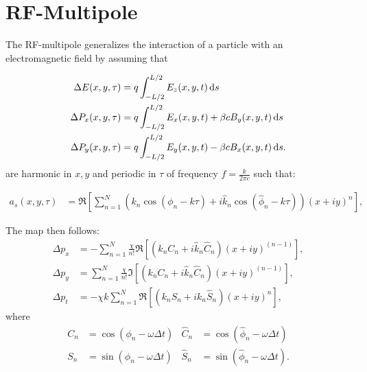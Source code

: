 \documentclass[english]{article}
\begin{document}
\section{RF-Multipole}

The RF-multipole generalizes the interaction of a particle with an electromagnetic field by assuming that

\begin{align}
\Delta E(x,y,\tau) &= q \int_{-L/2}^{L/2} E_z(x,y,t)  {\rm \,d}s \\
\Delta P_x(x,y,\tau) &= q \int_{-L/2}^{L/2} E_x(x,y,t) + \beta c B_y(x,y,t) {\rm \,d}s\\
\Delta P_y(x,y,\tau) &= q \int_{-L/2}^{L/2} E_y(x,y,t) - \beta c B_x(x,y,t) {\rm \,d}s.
\end{align}
are harmonic in $x,y$ and periodic in $\tau$ of frequency $f=\frac{k}{2\pi c}$ such that:

\begin{align}
a_s(x,y,\tau) 
&= \Re \left[ \sum_{n=1}^N
      \left(       k_n \cos(\phi_n -k \tau ) +
            i \hat k_n \cos(\hat \phi_n -k \tau)
      \right)    
      (x+i y )^n
     \right],
\end{align}

The map then follows:
\begin{align}
    \Delta p_x &= -\sum_{n=1}^N \frac{\chi}{n!} \Re\left[ (k_n C_n + i \hat k_n \hat C_n)(x+iy)^{(n-1)}\right], \\
    \Delta p_y &=  \sum_{n=1}^N \frac{\chi}{n!} \Im\left[ (k_n C_n + i \hat k_n \hat C_n)(x+iy)^{(n-1)}\right], \\
    \Delta p_t &= -\chi k \sum_{n=1}^N \Re\left[( k_n S_n + i k_n \hat S_n ) (x+iy)^n\right],
\end{align}
where
\begin{align}
     C_n&=\cos(\phi_n-\omega \Delta t) &
\hat C_n&=\cos(\hat \phi_n-\omega \Delta t) \\
     S_n&=\sin(\phi_n-\omega \Delta t) &
\hat S_n&=\sin(\hat \phi_n-\omega \Delta t) .
\end{align}
\end{document}

